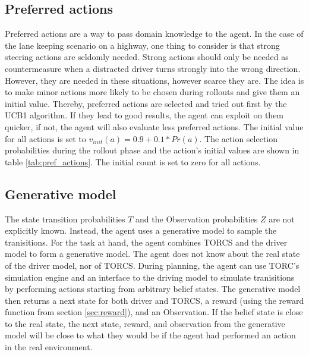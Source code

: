 \subsection{Preferred actions}
\label{sec:preferred_actions}

Preferred actions are a way to pass domain knowledge to the agent. In the case of the lane keeping scenario on a highway, one thing to consider is that strong steering actions are seldomly needed. Strong actions should only be needed as countermeasure when a distracted driver turns strongly into the wrong direction. However, they are needed in these situations, however scarce they are. The idea is to make minor actions more likely to be chosen during rollouts and give them an initial value. Thereby, preferred actions are selected and tried out first by the UCB1 algorithm. If they lead to good results, the agent can exploit on them quicker, if not, the agent will also evaluate less preferred actions. The initial value for all actions is set to  $ v_{init}(a) = 0.9 + 0.1 * Pr(a)$. The action selection probabilities during the rollout phase and the action's initial values are shown in table \ref{tab:pref_actions}. The initial count is set to zero for all actions.



\subsection{Generative model}
\label{sec:gen_model}

The state transition probabilities $T$ and the Observation probabilities $Z$ are not explicitly known. Instead, the agent uses a generative model to sample the tranisitions. For the task at hand, the agent combines TORCS and the driver model to form a generative model. The agent does not know about the real state of the driver model, nor of TORCS. During planning, the agent can use TORC's simulation engine and an interface to the driving model to simulate tranisitions by performing actions starting from arbitrary belief states. The generative model then returns a next state for both driver and TORCS, a reward (using the reward function from section \ref{sec:reward}), and an Observation. If the belief state is close to the real state, the next state, reward, and observation from the generative model will be close to what they would be if the agent had performed an action in the real environment.